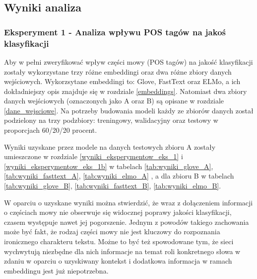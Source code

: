 

\subsection{Wyniki analiza}

\subsubsection{Eksperyment 1 - Analiza wpływu POS tagów na jakoś klasyfikacji}

Aby w pełni zweryfikować wpływ części mowy (POS tagów) na jakość klasyfikacji zostały wykorzystane trzy różne embeddingi oraz dwa różne zbiory danych wejściowych. Wykorzsytane embeddingi to: Glove, FastText oraz ELMo, a ich dokładniejszy opis znajduje się w rozdziale \ref{embeddings}. Natomiast dwa zbiory danych wejściowych (oznaczonych jako A oraz B) są opisane w rozdziale \ref{dane_wejsciowe}. Na potrzeby budowania modeli każdy ze zbiorów danych został podzielony na trzy podzbiory: treningowy, walidacyjny oraz testowy w proporcjach 60/20/20 procent.

Wyniki uzyskane przez modele na danych testowych zbioru A zostały umieszczone w rozdziale \ref{wyniki_eksperymentow_eks_1} i \ref{wyniki_eksperymentow_eks_1b} w tabelach \ref{tab:wyniki_glove_A}, \ref{tab:wyniki_fasttext_A}, \ref{tab:wyniki_elmo_A} , a dla zbioru B w tabelach \ref{tab:wyniki_glove_B}, \ref{tab:wyniki_fasttext_B}, \ref{tab:wyniki_elmo_B}.


W oparciu o uzyskane wyniki można stwierdzić, że wraz z dołączeniem informacji o częściach mowy nie obserwuje się widocznej poprawy jakości klasyfikacji, czasem występuje nawet jej pogorszenie. Jednym z powodów takiego zachowania może być fakt, że rodzaj części mowy nie jest kluczowy do rozpoznania ironicznego charakteru tekstu. Możne to być też spowodowane tym, że sieci wychwytują niezbędne dla nich informacje na temat roli konkretnego słowa w zdaniu w oparciu o uzyskiwany kontekst i dodatkowa informacja w ramach embeddingu jest już niepotrzebna.

